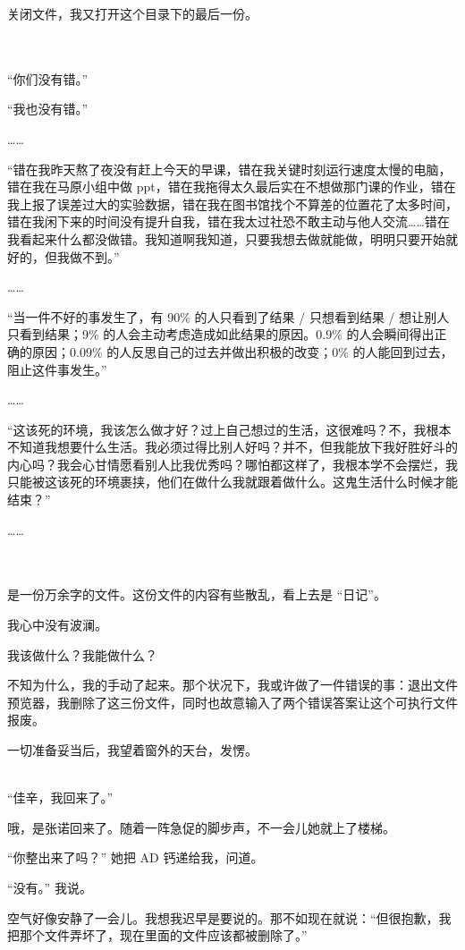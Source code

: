 \documentclass[UTF8]{ctexart}
\begin{document}
关闭文件，我又打开这个目录下的最后一份。

~\\
~\\

“你们没有错。”

“我也没有错。”

……

“错在我昨天熬了夜没有赶上今天的早课，错在我关键时刻运行速度太慢的电脑，错在我在马原小组中做 ppt，错在我拖得太久最后实在不想做那门课的作业，错在我上报了误差过大的实验数据，错在我在图书馆找个不算差的位置花了太多时间，错在我闲下来的时间没有提升自我，错在我太过社恐不敢主动与他人交流……错在我看起来什么都没做错。我知道啊我知道，只要我想去做就能做，明明只要开始就好的，但我做不到。”

……

“当一件不好的事发生了，有 90\% 的人只看到了结果 / 只想看到结果 / 想让别人只看到结果；9\% 的人会主动考虑造成如此结果的原因。0.9\% 的人会瞬间得出正确的原因；0.09\% 的人反思自己的过去并做出积极的改变；0\% 的人能回到过去，阻止这件事发生。”

……

“这该死的环境，我该怎么做才好？过上自己想过的生活，这很难吗？不，我根本不知道我想要什么生活。我必须过得比别人好吗？并不，但我能放下我好胜好斗的内心吗？我会心甘情愿看别人比我优秀吗？哪怕都这样了，我根本学不会摆烂，我只能被这该死的环境裹挟，他们在做什么我就跟着做什么。这鬼生活什么时候才能结束？”

……

~\\
~\\

是一份万余字的文件。这份文件的内容有些散乱，看上去是 “日记”。

我心中没有波澜。

我该做什么？我能做什么？

不知为什么，我的手动了起来。那个状况下，我或许做了一件错误的事：退出文件预览器，我删除了这三份文件，同时也故意输入了两个错误答案让这个可执行文件报废。

一切准备妥当后，我望着窗外的天台，发愣。

~\\

“佳辛，我回来了。”

哦，是张诺回来了。随着一阵急促的脚步声，不一会儿她就上了楼梯。

“你整出来了吗？” 她把 AD 钙递给我，问道。

“没有。” 我说。

空气好像安静了一会儿。我想我迟早是要说的。那不如现在就说：“但很抱歉，我把那个文件弄坏了，现在里面的文件应该都被删除了。”
\end{document}
